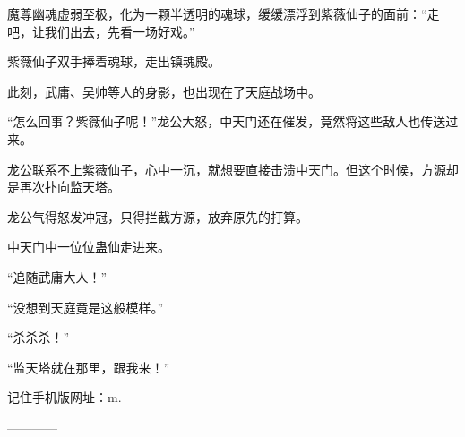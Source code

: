 \begin{this_body}
魔尊幽魂虚弱至极，化为一颗半透明的魂球，缓缓漂浮到紫薇仙子的面前：“走吧，让我们出去，先看一场好戏。”

紫薇仙子双手捧着魂球，走出镇魂殿。

此刻，武庸、吴帅等人的身影，也出现在了天庭战场中。

“怎么回事？紫薇仙子呢！”龙公大怒，中天门还在催发，竟然将这些敌人也传送过来。

龙公联系不上紫薇仙子，心中一沉，就想要直接击溃中天门。但这个时候，方源却是再次扑向监天塔。

龙公气得怒发冲冠，只得拦截方源，放弃原先的打算。

中天门中一位位蛊仙走进来。

“追随武庸大人！”

“没想到天庭竟是这般模样。”

“杀杀杀！”

“监天塔就在那里，跟我来！”

记住手机版网址：m.

------------

\end{this_body}

